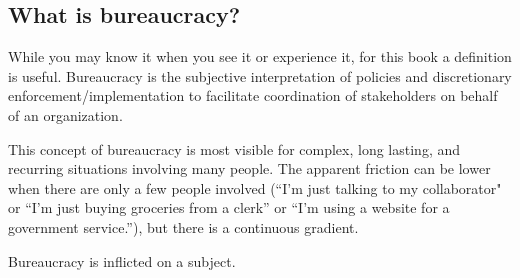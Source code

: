 \subsection{What is bureaucracy?}
While you may know it when you see it or experience it, for this book a definition is useful. 
\gls{Bureaucracy} is the subjective interpretation of policies and discretionary enforcement/implementation to facilitate coordination of stakeholders on behalf of an organization. 


This concept of bureaucracy is most visible for complex, long lasting, and recurring situations involving many people. The apparent friction can be lower when there are only a few people involved (``I'm just talking to my collaborator" or ``I'm just buying groceries from a clerk'' or ``I'm using a website for a government service.''), but there is a continuous gradient. 



Bureaucracy is inflicted on a \gls{subject}.